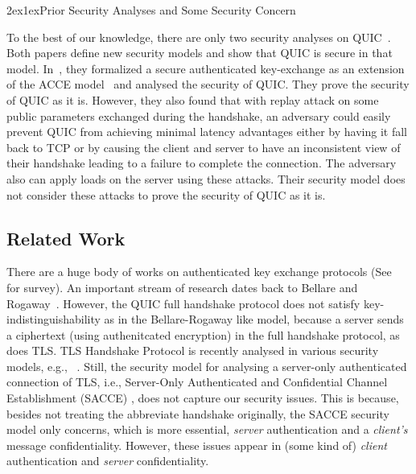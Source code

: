\documentclass[11pt,a4j]{jarticle}
\makeatletter
\renewcommand{\section}{\@startsection{section}{1}{\z@}%
{2ex}{1ex}{\reset@font\large\bfseries}}%
\makeatother
\begin{document}
\section{Prior Security Analyses and Some Security Concern}

To the best of our knowledge, there are only two security analyses on QUIC~\cite{FG14:QUIC,LJBN15:QUIC}.
Both papers define new security models and show that QUIC is secure in that model.
In~\cite{LJBN15:QUIC}, they formalized a secure authenticated key-exchange
as an extension of the ACCE model~\cite{JKSS12:ACCE} and analysed
the security of QUIC.
They prove the security of QUIC as it is.
However, they also found that with replay attack on some public parameters exchanged during the handshake, an adversary could easily prevent QUIC from achieving minimal latency advantages either by having it fall back to TCP or by causing the client and server to have an inconsistent view of their handshake leading to a failure to complete the connection.
The adversary also can apply loads on the server using these attacks.
Their security model does not consider these attacks to prove the security of QUIC as it is.


\subsection{Related Work} \label{sec:Related Work}
There are a huge body of works on authenticated key exchange protocols
(See~\cite{CK01:AKE} for survey).
An important stream of research dates back to Bellare and Rogaway~\cite{BR93:AKE}.
However,
the QUIC full handshake protocol does not satisfy key-indistinguishability as in the Bellare-Rogaway like model, because a server sends a ciphertext (using authenitcated encryption) in the full handshake protocol, as does TLS.
TLS Handshake Protocol is recently analysed in various security models, e.g., ~\cite{JKSS12:ACCE,KPW13:SACCE,FS13:ACCE,BFKPSB14:TLS}.
Still,
the security model for analysing a server-only authenticated connection of TLS,
i.e., Server-Only Authenticated and Confidential Channel Establishment (SACCE) \cite{KPW13:SACCE}, does not capture our security issues.
This is because, besides not treating the abbreviate handshake originally,
the SACCE security model only concerns, which is more essential,
\textit{server} authentication and a \textit{client's} message confidentiality.
However, these issues appear in (some kind of) \textit{client} authentication
and \textit{server} confidentiality.
\end{document}
